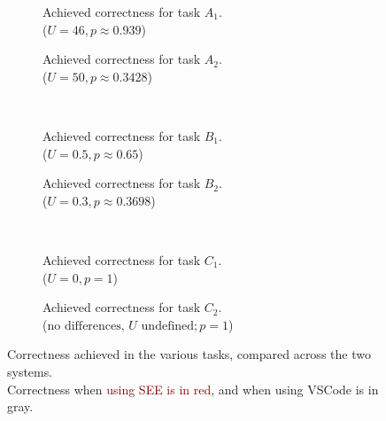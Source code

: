 \documentclass[../thesis]{subfiles}
\begin{document}
\begin{figure}
	\begin{subfigure}[T]{0.5\textwidth}
		\caption{Achieved correctness for task $A_1$.\\
			($U = 46, p \approx 0.939$)
			\label{fig:a1c}}
	\end{subfigure}\hfill
	\begin{subfigure}[T]{0.5\textwidth}
		\caption{Achieved correctness for task $A_2$.\\
			($U = 50, p \approx 0.3428$)\label{fig:a2c}}
	\end{subfigure}\\
	\begin{subfigure}[T]{0.5\textwidth}
		\caption{Achieved correctness for task $B_1$.\\
			($U = 0.5, p \approx 0.65$)\label{fig:b1c}}
	\end{subfigure}\hfill
	\begin{subfigure}[T]{0.5\textwidth}
		\caption{Achieved correctness for task $B_2$.\\
			($U = 0.3, p \approx 0.3698$)\label{fig:b2c}}
	\end{subfigure}\\
	\begin{subfigure}[T]{0.5\textwidth}
		\caption{Achieved correctness for task $C_1$.\\
			($U = 0, p = 1$)\label{fig:c1c}}
	\end{subfigure}\hfill
	\begin{subfigure}[T]{0.5\textwidth}
		\caption{Achieved correctness for task $C_2$.\\
			($\text{no differences, } U \text{ undefined}; p = 1$)\label{fig:c2c}}
	\end{subfigure}
	\caption{Correctness achieved in the various tasks, compared across the two systems.\\
		Correctness when \textcolor{Maroon}{using SEE is in red}, and when \textcolor{Gray!50!black}{using VSCode is in gray}.}\label{fig:correctness}
\end{figure}
\end{document}
